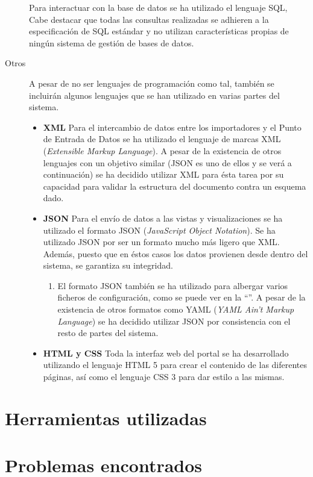 \begin{description}
		Para interactuar con la base de datos se ha utilizado el lenguaje SQL, Cabe destacar que todas las consultas realizadas se adhieren a la especificación de SQL estándar y no utilizan características propias de ningún sistema de gestión de bases de datos.
	\item[Otros]
		A pesar de no ser lenguajes de programación como tal, también se incluirán algunos lenguajes que se han utilizado en varias partes del sistema.
		\begin{itemize}
			\item \textbf{XML}
				Para el intercambio de datos entre los importadores y el Punto de Entrada de Datos se ha utilizado el lenguaje de marcas XML (\textit{Extensible Markup Language}).  A pesar de la existencia de otros lenguajes con un objetivo similar (JSON es uno de ellos y se verá a continuación) se ha decidido utilizar XML para ésta tarea por su capacidad para validar la estructura del documento contra un esquema dado.
			\item \textbf{JSON}
			Para el envío de datos a las vistas y visualizaciones se ha utilizado el formato JSON (\textit{JavaScript Object Notation}).  Se ha utilizado JSON por ser un formato mucho más ligero que XML.  Además, puesto que en éstos casos los datos provienen desde dentro del sistema, se garantiza su integridad.
				\begin{enumerate}
				\item
					El formato JSON también se ha utilizado para albergar varios ficheros de configuración, como se puede ver en la ``''.  A pesar de la existencia de otros formatos como YAML (\textit{YAML Ain't Markup Language}) se ha decidido utilizar JSON por consistencia con el resto de partes del sistema.
				\end{enumerate}
			\item \textbf{HTML y CSS}
			Toda la interfaz web del portal se ha desarrollado utilizando el lenguaje HTML 5 para crear el contenido de las diferentes páginas, así como el lenguaje CSS 3 para dar estilo a las mismas.
		\end{itemize}
\end{description}


\section{Herramientas utilizadas}
\label{implementacion:herramientas_utilizadas}


\section{Problemas encontrados}
\label{implementacion:problemas_encontrados}